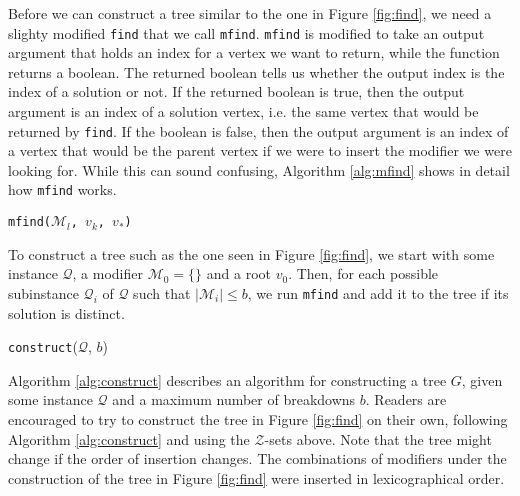 Before we can construct a tree similar to the one in Figure \ref{fig:find},
we need a slighty modified \texttt{find} that we call \texttt{mfind}.
\texttt{mfind} is modified to take an output argument that holds an index for
a vertex we want to return, while the function returns a boolean.
The returned boolean tells us whether the output index is the index of a
solution or not. If the returned boolean is true, then the output argument is
an index of a solution vertex, i.e. the same vertex that would be returned
by \texttt{find}.
If the boolean is false, then the output argument is an index of a vertex
that would be the parent vertex if we were to insert the modifier we were
looking for. While this can sound confusing, Algorithm \ref{alg:mfind} shows
in detail how \texttt{mfind} works.

\begin{algorithm}[ht!]
\caption{\texttt{mfind($\mathcal{M}_l$, $v_k$, $v_*$)}}
\label{alg:mfind}

\end{algorithm}
To construct a tree such as the one seen in Figure \ref{fig:find}, we start
with some instance $\mathcal{Q}$, a modifier $\mathcal{M}_0 = \{ {} \}$ and
a root $v_0$.
Then, for each possible subinstance $\mathcal{Q}_i$ of $\mathcal{Q}$ such that
$|\mathcal{M}_i| \leq b$, we run \texttt{mfind} and add it to the tree if its
solution is distinct.

\begin{algorithm}[ht!]
\caption{\texttt{construct}($\mathcal{Q}$, $b$)}
\label{alg:construct}

\end{algorithm}
Algorithm \ref{alg:construct} describes an algorithm for constructing a tree
$G$, given some instance $\mathcal{Q}$ and a maximum number of breakdowns $b$.
Readers are encouraged to try to construct the tree in Figure \ref{fig:find} on
their own, following Algorithm \ref{alg:construct} and using the
$\mathcal{Z}$-sets above. Note that the tree might change if the order of
insertion changes. The combinations of modifiers under the construction of the
tree in Figure \ref{fig:find} were inserted in lexicographical order.
